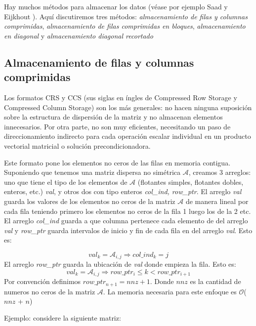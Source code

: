 \documentclass[a4paper,openright,12pt, oneside]{book}
\DeclareRobustCommand{\orderof}{\ensuremath{\mathcal{O}}}
\newcommand{\implica}{\Rightarrow}
\begin{document}
Hay muchos m\'etodos para almacenar los datos (v\'ease por ejemplo Saad \cite{SPARSKIT} y Eijkhout \cite{LAPACK}). Aqu\'i discutiremos tres m\'etodos: \textit{almacenamiento de filas y columnas comprimidas}, \textit{almacenamiento de filas comprimidas en bloques}, \textit{almacenamiento en diagonal} y \textit{almacenamiento diagonal recortado}

\subsection{Almacenamiento de filas y columnas comprimidas}\label{CCS}


Los formatos CRS y CCS (sus siglas en \'ingles de Compressed Row Storage y Compressed Column Storage) son los m\'as generales: no hacen ninguna suposici\'on sobre la estructura de dispersi\'on de la matriz y no almacenan elementos innecesarios. Por otra parte, no son muy eficientes, necesitando un paso de direccionamiento indirecto para cada operaci\'on escalar individual en un producto vectorial matricial o soluci\'on precondicionadora.

Este formato pone los elementos no ceros de las filas en memoria contigua. Suponiendo que tenemos una matriz dispersa no sim\'etrica $\mathcal{A}$, creamos 3 arreglos: uno que tiene el tipo de los elementos de $\mathcal{A}$ (flotantes simples, flotantes dobles, enteros, etc.) \textit{val}, y otros dos con tipo enteros \textit{col\_ind, row\_ptr}. El arreglo \textit{val} guarda los valores de los elementos no ceros de la matriz $\mathcal{A}$ de manera lineal por cada fila teniendo primero los elementos no ceros de la fila 1 luego los de la 2 etc. 
El arreglo \textit{col\_ind} guarda a que columna pertenece cada elemento de del arreglo \textit{val} y \textit{row\_ptr} guarda intervalos de inicio y fin de cada fila en del arreglo \textit{val}. Esto es: 

$$val_{k} = \mathcal{A}_{i,j} \implica col\_ind_{k} = j $$
El arreglo \textit{row\_ptr} guarda la ubicaci\'on de \textit{val} donde empieza la fila. Esto es:
$$val_{k} = \mathcal{A}_{i,j} \implica row\_ptr_{i} \leq k < row\_ptr_{i+1} $$
Por convenci\'on definimos $row\_ptr_{n+1} = nnz + 1$. Donde $nnz$ es la cantidad de numeros no ceros de la matriz $\mathcal{A}$. La memoria necesaria para este enfoque es \orderof($nnz$ + $n$)

Ejemplo: considere la siguiente matriz:
\end{document}

